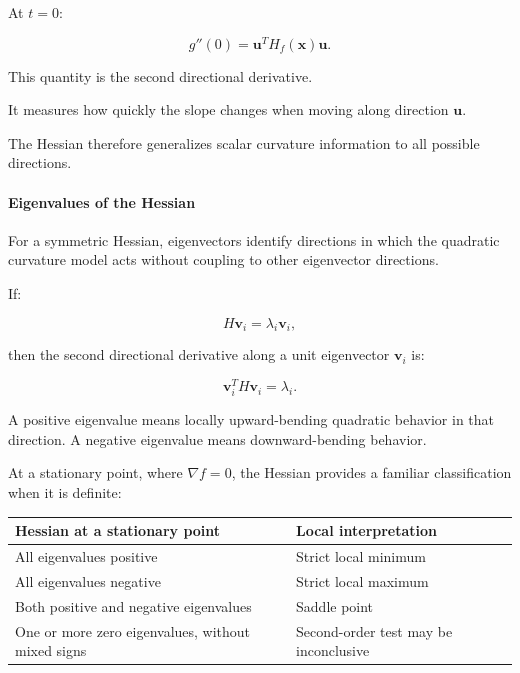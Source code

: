 At \(t=0\):

\[
\boxed{ g''(0)=\mathbf u^TH_f(\mathbf x)\mathbf u }.
\]

This quantity is the second directional derivative.

It measures how quickly the slope changes when moving along direction \(\mathbf u\).

The Hessian therefore generalizes scalar curvature information to all possible directions.

\paragraph{Eigenvalues of the Hessian}\label{02-foundations-ii-ch021-eigenvalues-of-the-hessian}

\hypertarget{02-foundations-ii-ch021-eigenvalues-of-the-hessian}{}

For a symmetric Hessian, eigenvectors identify directions in which the quadratic curvature model acts without coupling to other eigenvector directions.

If:

\[
H\mathbf v_i=\lambda_i\mathbf v_i,
\]

then the second directional derivative along a unit eigenvector \(\mathbf v_i\) is:

\[
\mathbf v_i^TH\mathbf v_i=\lambda_i.
\]

A positive eigenvalue means locally upward-bending quadratic behavior in that direction. A negative eigenvalue means downward-bending behavior.

At a stationary point, where \(\nabla f=0\), the Hessian provides a familiar classification when it is definite:

{\def\LTcaptype{none} %
\begin{longtable}[]{@{}
  >{\raggedright\arraybackslash}p{}
  >{\raggedright\arraybackslash}p{}@{}}
\toprule\noalign{}
\begin{minipage}[b]{\linewidth}\raggedright
Hessian at a stationary point
\end{minipage} & \begin{minipage}[b]{\linewidth}\raggedright
Local interpretation
\end{minipage} \\
\midrule\noalign{}
\endhead
\bottomrule\noalign{}
\endlastfoot
All eigenvalues positive & Strict local minimum \\
All eigenvalues negative & Strict local maximum \\
Both positive and negative eigenvalues & Saddle point \\
One or more zero eigenvalues, without mixed signs & Second-order test may be inconclusive \\
\end{longtable}
}

